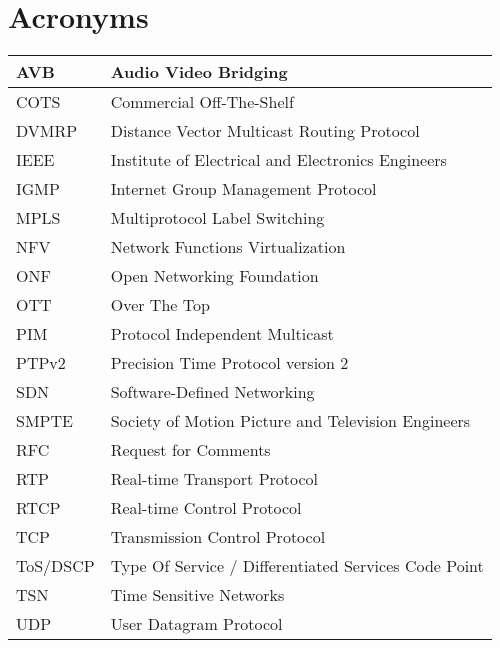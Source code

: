 \cleardoublepage
{}
\chapter*{Acronyms}

\begin{table*}[htb]
\centering
\begin{tabular}{p{} p{}}
\hline
AVB & Audio Video Bridging \\
\hline
COTS & Commercial Off-The-Shelf \\
\hline
DVMRP & Distance Vector Multicast Routing Protocol \\
\hline
IEEE & Institute of Electrical and Electronics Engineers \\
\hline
IGMP & Internet Group Management Protocol \\
\hline
MPLS & Multiprotocol Label Switching \\
\hline
NFV & Network Functions Virtualization \\
\hline
ONF & Open Networking Foundation \\
\hline
OTT & Over The Top \\
\hline
PIM & Protocol Independent Multicast \\
\hline
PTPv2 & Precision Time Protocol version 2 \\
\hline
SDN & Software-Defined Networking \\
\hline
SMPTE & Society of Motion Picture and Television Engineers \\
\hline
RFC & Request for Comments \\
\hline
RTP & Real-time Transport Protocol \\
\hline
RTCP & Real-time Control Protocol  \\
\hline
TCP & Transmission Control Protocol \\
\hline
ToS/DSCP & Type Of Service / Differentiated Services Code Point \\
\hline
TSN & Time Sensitive Networks \\
\hline
UDP & User Datagram Protocol \\
\hline
\end{tabular}
\end{table*}


